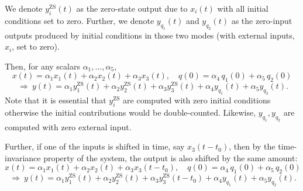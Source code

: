 \documentclass{ee102_notes}
\begin{document}
We denote $y_i^{\mathrm{ZS}}(t)$ as the zero-state output due to $x_i(t)$ with all initial conditions set to zero. Further, we denote $y_{q_1}(t)$ and $y_{q_2}(t)$ as the zero-input outputs produced by initial conditions in those two modes (with external inputs, $x_i$, set to zero).

Then, for any scalars $\alpha_1,\dots,\alpha_5$,
\[
x(t)=\alpha_1 x_1(t)+\alpha_2 x_2(t)+\alpha_3 x_3(t),\quad
q(0)=\alpha_4\,q_1(0)+\alpha_5\,q_2(0)
\]
\[
~\Longrightarrow~
y(t)=\alpha_1 y_1^{\mathrm{ZS}}(t)+\alpha_2 y_2^{\mathrm{ZS}}(t)+\alpha_3 y_3^{\mathrm{ZS}}(t)
      +\alpha_4 y_{q_1}(t)+\alpha_5 y_{q_2}(t).
\]
Note that it is essential that $y_i^{\mathrm{ZS}}$ are computed with zero initial conditions otherwise the initial contributions would be double-counted. Likewise, $y_{q_1},y_{q_2}$ are computed with zero external input.

Further, if one of the inputs is shifted in time, say $x_3(t-t_0)$, then by the time-invariance property of the system, the output is also shifted by the same amount:
\[
x(t)=\alpha_1 x_1(t)+\alpha_2 x_2(t)+\alpha_3 x_3(t-t_0),\quad
q(0)=\alpha_4\,q_1(0)+\alpha_5\,q_2(0)
\]
\[
~\Longrightarrow~
y(t)=\alpha_1 y_1^{\mathrm{ZS}}(t)+\alpha_2 y_2^{\mathrm{ZS}}(t)+\alpha_3 y_3^{\mathrm{ZS}}(t-t_0)
      +\alpha_4 y_{q_1}(t)+\alpha_5 y_{q_2}(t).
\]
\end{document}
